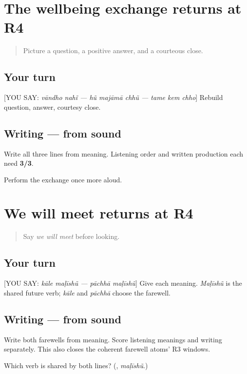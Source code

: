 \section[Practice]{The wellbeing exchange returns at R4}

\label{lesson:GU-R18-wellbeing-r4}



\begin{quote}
Picture a question, a positive answer, and a courteous close.
\end{quote}

\subsection*{Your turn}
{[}YOU SAY: \emph{vāndho nahĩ — hũ majāmā chhũ — tame kem chho}{]} Rebuild question, answer, courtesy close.

\subsection*{Writing — from sound}
Write all three lines from meaning. Listening order and written production each need \textbf{3/3}.

\begin{tcolorbox}[breakable,colback=teal!4,colframe=teal!35!black,title={Before you move on}]
Perform the exchange once more aloud.
\end{tcolorbox}
\section[Practice]{We will meet returns at R4}

\label{lesson:GU-R18-farewell-r4}



\begin{quote}
Say \emph{we will meet} before looking.
\end{quote}

\subsection*{Your turn}
{[}YOU SAY: \emph{kāle maḷīshũ — pāchhā maḷīshũ}{]} Give each meaning. \emph{Maḷīshũ} is the shared future verb; \emph{kāle} and \emph{pāchhā} choose the farewell.

\subsection*{Writing — from sound}
Write both farewells from meaning. Score listening meanings and writing separately. This also closes the coherent farewell atoms' R3 windows.

\begin{tcolorbox}[breakable,colback=teal!4,colframe=teal!35!black,title={Before you move on}]
Which verb is shared by both lines? (\textbf{}, \emph{maḷīshũ}.)
\end{tcolorbox}
